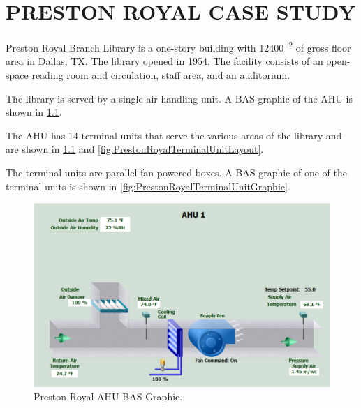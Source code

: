 \chapter{\texorpdfstring{\MakeUppercase{Preston Royal Case Study}}{Preston Royal Case Study}}
\label{sec:preston}

Preston Royal Branch Library is a one-story building with               
\SI{12400}{\feet\squared} of gross floor area in Dallas, TX. The        
library opened in 1954. The facility consists of an open-space reading  
room and circulation, staff area, and an auditorium.                    

The library is served by a single air handling unit. A BAS graphic of
the AHU is shown in \figref{} \ref{fig:PrestonRoyalAHUGraphic}. 

The AHU has 14 terminal units that serve the various areas of the
library and are shown in \figref{} \ref{fig:PrestonRoyalAHUGraphic} and
\ref{fig:PrestonRoyalTerminalUnitLayout}.

The terminal units are parallel fan powered boxes. A BAS graphic of one
of the terminal units is shown in \figref{}
\ref{fig:PrestonRoyalTerminalUnitGraphic}.

\begin{figure}
\centering
\includegraphics[width=\textwidth]{Images/PrestonRoyalAHUGraphic.PNG}
\caption{Preston Royal AHU BAS Graphic.}
\label{fig:PrestonRoyalAHUGraphic}
\end{figure}

